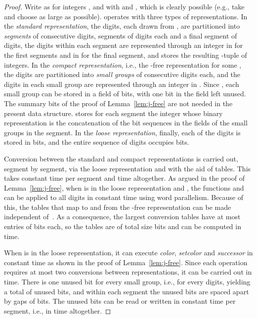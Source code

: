 \documentclass[envcountsame,envcountsect,undated,nolinenumbers]{lnthi}
\def\Tvn#1{\hbox{\textit{#1\/}}}
\begin{document}
\begin{proof}
Write  as  for integers
,  and  with  and
, which is clearly
possible (e.g., take  and
choose  as large as possible).
 operates with three types of representations.
In the \emph{standard representation}, the
 digits, each drawn from ,
are partitioned into \emph{segments} of consecutive
digits,  segments of  digits each and a
final segment of  digits,
the digits within each segment are represented through an
integer in  for the
 first segments and in
 for the final segment,
and  stores the resulting -tuple of integers.
In the \emph{compact representation}, i.e., the
-free representation for some
,
the digits are
partitioned into \emph{small groups} of
 consecutive digits each, and the digits
in each small group are represented through
an integer in .
Since , each small group can
be stored in a field of
 bits, with one bit
in the field left unused.
The summary bits of the proof of
Lemma~\ref{lem:j-free} are not needed
in the present data structure.
 stores for each
segment the integer whose binary representation is
the concatenation of the bit sequences in the fields
of the small groups in the segment.
In the \emph{loose representation}, finally,
each of the  digits is stored in
 bits, and the entire sequence
of  digits occupies
 bits.

Conversion between the standard and compact
representations is carried out, segment by
segment, via the loose
representation and with the aid of tables.
This takes constant time per segment
and  time altogether.
As argued in the proof of Lemma~\ref{lem:j-free},
when  is in the loose representation
and ,
the functions  and 
can be applied to all digits in constant time
using word parallelism.
Because of this, the tables that map to and from
the -free representation can be made independent of~.
As a consequence, the largest conversion tables
have at most 
entries of  bits each,
so the tables are of total size
 bits and can be computed in  time.

When  is in the loose representation, it
can execute \Tvn{color}, \Tvn{setcolor} and
\Tvn{successor} in constant time as shown
in the proof of Lemma~\ref{lem:j-free}.
Since each operation requires at most two
conversions between representations,
it can be carried out in  time.
There is one unused bit for every
small group, i.e., for every  digits,
yielding a total of  unused bits,
and within each segment the unused bits are spaced
apart by gaps of  bits.
The unused bits can be read or written in
constant time per segment,
i.e., in  time altogether.
\end{proof}
\end{document}
